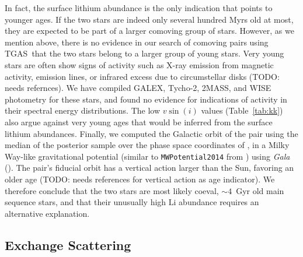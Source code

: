 \documentclass[modern, letterpaper]{aastex61}
\newcommand{\project}[1]{\textsl{#1}}
\newcommand{\acronym}[1]{{\small{#1}}}
\newcommand{\tgas}{\acronym{TGAS}}
\newcommand*\elem[1]{\ensuremath{\mathrm{#1}}}
\newcommand{\sunanalog}{\text{Krios}}
\newcommand{\todo}[1]{{\color{blue}TODO: #1}}
\renewcommand\tablename{Table}
\begin{document}
In fact, the surface lithium abundance is the only indication that points to
younger ages.
If the two stars are indeed only several hundred Myrs old at most,
they are expected to be part of a larger comoving group of stars.
However, as we mention above, there is no evidence in our search of comoving pairs
using \tgas\ that the two stars belong to a larger group of young stars.
Very young stars are often show signs of activity such as
X-ray emission from magnetic activity, emission lines, or infrared excess due to
circumstellar disks (\todo{needs refernces}).
We have compiled GALEX, Tycho-2, 2MASS, and WISE photometry for these stars,
and found no evidence for indications of activity in their spectral energy
distributions.
The low $v\sin(i)$ values (\tablename~\ref{tab:kk}) also argue against very
young ages that would be inferred from the surface lithium abundances.
Finally, we computed the Galactic orbit of the pair using the median of the
posterior sample over the phase space coordinates of \sunanalog, in a Milky
Way-like gravitational potential (similar to \texttt{MWPotential2014} from
\citealt{Bovy:2015}) using \project{Gala} (\citealt{gala}).
The pair's fiducial orbit has a vertical action larger than the Sun, favoring
an older age (\todo{needs references for vertical action as age indicator}).
We therefore conclude that the two stars are most likely coeval, $\sim 4$~Gyr
old main sequence stars, and that their unusually high \elem{Li} abundance
requires an alternative explanation.


\subsection{Exchange Scattering}
\label{sub:exchange_scattering}
\end{document}
